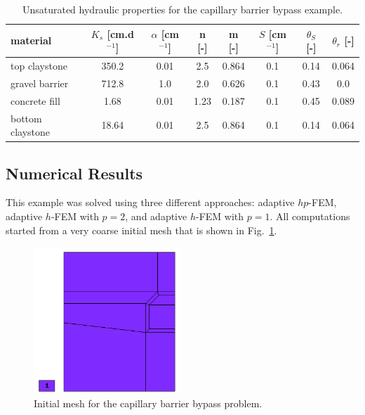 \documentclass[final,3p,times,twocolumn]{elsarticle}
\begin{document}
\begin{table}[!htb]
\begin{center}
\begin{tabular}{|l||c|c|c|c|c|c|c|}
\hline
material & $K_s$ [cm.d${}^{-1}$] & $\alpha$ [cm${}^{-1}$] & n [-] & m [-] &  $S$ [cm${}^{-1}$] & $\theta_S$ [-] & $\theta_r$ [-]\\
\hline
\hline
top claystone & 350.2 & 0.01 & 2.5 & 0.864 & 0.1 & 0.14 & 0.064 \\ \hline
gravel barrier & 712.8 & 1.0 & 2.0 & 0.626 & 0.1 & 0.43 & 0.0 \\ \hline
concrete fill & 1.68 & 0.01 & 1.23 & 0.187 & 0.1 &  0.45 & 0.089 \\ \hline
bottom claystone & 18.64 & 0.01 & 2.5 & 0.864 & 0.1 & 0.14 & 0.064 \\ \hline
\end{tabular}
\end{center}
\vspace{-4mm}
\caption{Unsaturated hydraulic properties for the capillary barrier bypass example.}
\label{tab:mat-example3}
\end{table}



\subsection{Numerical Results}

This example was solved using three different approaches: 
adaptive $hp$-FEM, adaptive $h$-FEM with $p=2$, and adaptive $h$-FEM 
with $p=1$. All computations started from a very coarse initial mesh 
that is shown in Fig.~\ref{fig:example3-initmesh}.

\begin{figure}[!htb]
\begin{center}
\includegraphics[height=5.5cm]{mesh_init3.png}
\end{center}
\vspace{-4mm}
\caption{Initial mesh for the capillary barrier bypass problem.}
\label{fig:example3-initmesh}
\end{figure}
\end{document}
